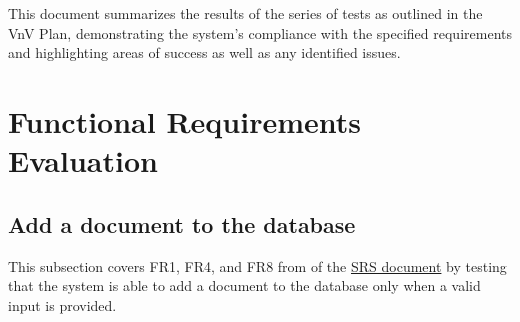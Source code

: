 \documentclass[12pt, titlepage]{article}
\begin{document}

\newpage

\tableofcontents

\listoftables 

\listoffigures

\newpage


This document summarizes the results of the series of tests as outlined in the VnV Plan, demonstrating the system's compliance with the specified requirements and highlighting areas of success as well as any identified issues. \\

\section{Functional Requirements Evaluation} \label{section:3} 

\subsection{Add a document to the database} \label{section:3.1}

This subsection covers FR1, FR4, and FR8 from of the \href{https://github.com/Inreet-Kaur/capstone/blob/main/docs/SRS/SRS.pdf}{SRS document} by testing that the system is able to add a document to the database only when a valid input is provided.
\end{document}
